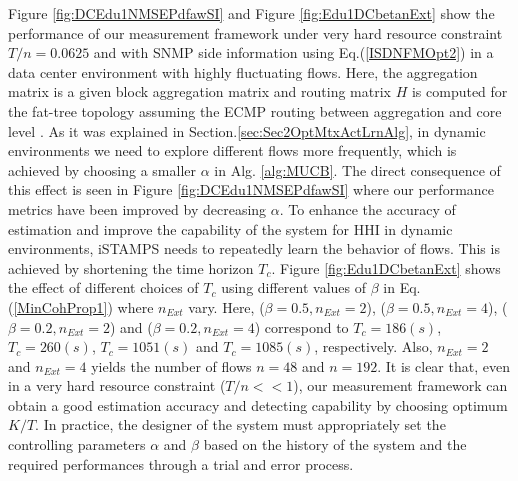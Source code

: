 Figure \ref{fig:DCEdu1NMSEPdfawSI} and Figure \ref{fig:Edu1DCbetanExt} show  the performance of our measurement framework under very hard resource constraint $T/n=0.0625$ and with SNMP side information using Eq.(\ref{ISDNFMOpt2}) in a data center environment with highly fluctuating flows. Here, the aggregation matrix is a given block aggregation matrix and routing matrix $H$ is computed for the fat-tree topology assuming the ECMP routing between aggregation and core level \cite{Benson:2010}. As it was explained in Section.\ref{sec:Sec2OptMtxActLrnAlg}, in dynamic environments we need to explore different flows more frequently, which is achieved by choosing a smaller $\alpha$ in Alg. \ref{alg:MUCB}. The direct consequence of this effect is seen in Figure \ref{fig:DCEdu1NMSEPdfawSI} where our performance metrics have been improved by decreasing $\alpha$. To enhance the accuracy of estimation and improve the capability of the system for HHI in dynamic environments, iSTAMPS needs to repeatedly learn the behavior of flows. This is achieved by shortening the time horizon $T_{c}$. Figure \ref{fig:Edu1DCbetanExt} shows the effect of different choices of $T_{c}$ using different values of $\beta$ in Eq.(\ref{MinCohProp1}) where $n_{Ext}$ vary. Here, ($\beta=0.5,n_{Ext}=2$), ($\beta=0.5,n_{Ext}=4$), ($\beta=0.2,n_{Ext}=2$) and ($\beta=0.2,n_{Ext}=4$) correspond to $T_{c}=186 (s)$, $T_{c}=260 (s)$, $T_{c}=1051 (s)$ and $T_{c}=1085 (s)$, respectively. Also, $n_{Ext}=2$ and $n_{Ext}=4$ yields the number of flows $n=48$ and $n=192$. It is clear that, even in a very hard resource constraint ($T/n<<1$), our measurement framework can obtain a good estimation accuracy and detecting capability by choosing optimum $K/T$. In practice, the designer of the system must appropriately set the controlling parameters $\alpha$ and $\beta$ based on the history of the system and the required performances through a trial and error process.

